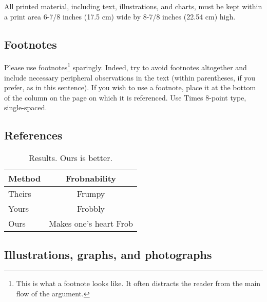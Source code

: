 \documentclass[10pt,twocolumn,letterpaper]{article}
\begin{document}
All printed material, including text, illustrations, and charts, must be kept
within a print area 6-7/8 inches (17.5 cm) wide by 8-7/8 inches (22.54 cm)
high.





\subsection{Footnotes}

Please use footnotes\footnote {This is what a footnote looks like.  It
often distracts the reader from the main flow of the argument.} sparingly.
Indeed, try to avoid footnotes altogether and include necessary peripheral
observations in
the text (within parentheses, if you prefer, as in this sentence).  If you
wish to use a footnote, place it at the bottom of the column on the page on
which it is referenced. Use Times 8-point type, single-spaced.

\subsection{References}

{\small
	
	
}


%
%

\begin{table}
\begin{center}
\begin{tabular}{|l|c|}
\hline
Method & Frobnability \\
\hline\hline
Theirs & Frumpy \\
Yours & Frobbly \\
Ours & Makes one's heart Frob\\
\hline
\end{tabular}
\end{center}
\caption{Results.   Ours is better.}
\end{table}

\subsection{Illustrations, graphs, and photographs}
\end{document}
